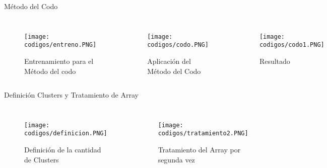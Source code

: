 \documentclass[aspectratio=169,xcolor=dvipsnames]{beamer}
\begin{document}
\begin{frame}{Método del Codo}
    \begin{columns}
        \begin{figure}
            \centering
            \texttt{[image: codigos/entreno.PNG]}
            {\footnotesize %
            \caption{Entrenamiento para el Método del codo}
            \label{fig8}
            }
        \end{figure}
        \begin{figure}
            \centering
            \texttt{[image: codigos/codo.PNG]}
            {\footnotesize %
            \caption{Aplicación del Método del Codo}
            \label{fig9}
            }
        \end{figure}
        \begin{figure}
            \centering
            \texttt{[image: codigos/codo1.PNG]}
            {\footnotesize %
            \caption{Resultado}
            \label{fig10}
            }
        \end{figure}

    \end{columns}
\end{frame}
\begin{frame}{Definición Clusters y Tratamiento de Array}
    \begin{columns}

        \begin{figure}
            \centering
            \texttt{[image: codigos/definicion.PNG]}
            {\footnotesize %
            \caption{Definición de la cantidad de Clusters}
            \label{fig11}
            }
        \end{figure}
        \begin{figure}
            \centering
            \texttt{[image: codigos/tratamiento2.PNG]}
            {\footnotesize %
            \caption{Tratamiento del Array por segunda vez}
            \label{fig12}
            }
        \end{figure}

    \end{columns}
\end{frame}
\end{document}
